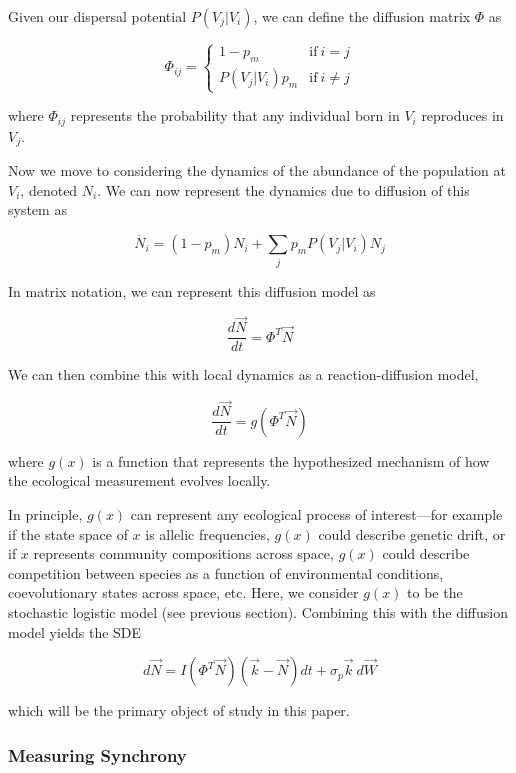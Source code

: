Given our dispersal potential \(P(V_j|V_i)\), we can define the
diffusion matrix \(\Phi\) as

\[\Phi_{ij} = \begin{cases} 1 - p_m \quad\quad &\text{if}\ i = j \\ P(V_j|V_i)p_m & \text{if}\ i \neq j\end{cases}\]

where \(\Phi_{ij}\) represents the probability that any individual born
in \(V_i\) reproduces in \(V_j\).

Now we move to considering the dynamics of the abundance of the
population at \(V_i\), denoted \(N_i\). We can now represent the
dynamics due to diffusion of this system as

\[\dot{N_i}=(1-p_m)N_i+ \sum_j p_mP(V_j|V_i)N_j\]

In matrix notation, we can represent this diffusion model as

\[\frac{d\vec{N}}{dt}=\Phi^T\vec{N}\]

We can then combine this with local dynamics as a reaction-diffusion
model,

\[\frac{d\vec{N}}{dt} = g(\Phi^T \vec{N})\]

where \(g(x)\) is a function that represents the hypothesized mechanism
of how the ecological measurement evolves locally.

In principle, \(g(x)\) can represent any ecological process of
interest---for example if the state space of \(x\) is allelic
frequencies, \(g(x)\) could describe genetic drift, or if \(x\)
represents community compositions across space, \(g(x)\) could describe
competition between species as a function of environmental conditions,
coevolutionary states across space, etc. Here, we consider \(g(x)\) to
be the stochastic logistic model (see previous section). Combining this
with the diffusion model yields the SDE

\begin{equation} \label{diffusion_model}
  d \vec{N} = {I} (\Phi^T \vec{N})(\vec{k}-\vec{N}) dt + \sigma_p \vec{k} \ d\vec{W}
\end{equation}

which will be the primary object of study in this paper.

\hypertarget{measuring-synchrony}{%
\subsubsection{Measuring Synchrony}\label{measuring-synchrony}}

